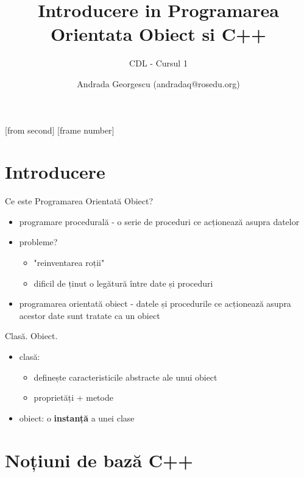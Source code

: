 \documentclass{beamer}
\title[Introducere in POO]{Introducere in Programarea Orientata Obiect si C++}
\subtitle{CDL - Cursul 1}
\institute[ROSEdu]{ROSEdu}
\author[Q]{Andrada Georgescu (andradaq@rosedu.org)}
\begin{document}
     

[from second]
[frame number]

\frame{\titlepage}

\begin{frame}
\tableofcontents
\end{frame}

\section{Introducere}

\begin{frame}{Ce este Programarea Orientată Obiect?}
  \begin{itemize} %
  \item programare procedurală  - o serie de proceduri ce acționează asupra datelor
  \item probleme? 
  \begin{itemize}  
  	\item "reinventarea roții"
	\item dificil de ținut o legătură între date și proceduri
  \end{itemize}
  \item programarea orientată obiect  - datele și procedurile ce acționează asupra acestor date sunt tratate ca un obiect
  \end{itemize}
\end{frame}   

\begin{frame}{Clasă. Obiect.}
  \begin{itemize}
  \item clasă:
  \begin{itemize}
	\item definește caracteristicile abstracte ale unui obiect	
    \item proprietăți + metode
  \end{itemize}
  \item obiect: o \textbf{instanță} a unei clase %
  \end{itemize}
\end{frame}

\section{Noțiuni de bază C++}
\end{document}

